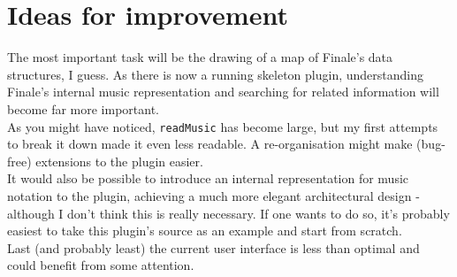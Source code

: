 \documentclass{article}
\begin{document}
\section{Ideas for improvement}
The most important task will be the drawing of a map of Finale's data structures, I guess. As there is now
a running skeleton plugin, understanding Finale's internal music representation and searching for related
information will become far more important.\\
As you might have noticed, \verb"readMusic" has become large, but my first attempts to break it down made it even
less readable. A re-organisation might make (bug-free) extensions to the plugin easier.\\
It would also be possible to introduce an internal representation for music notation to the plugin, achieving
a much more elegant architectural design - although I don't think this is really necessary. If one wants to do
so, it's probably easiest to take this plugin's source as an example and start from scratch.\\
Last (and probably least) the current user interface is less than optimal and could benefit from some attention.
\end{document}
